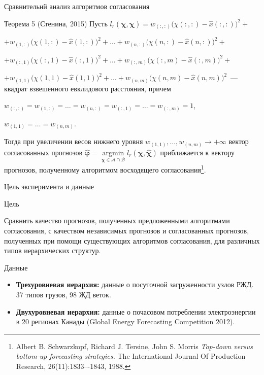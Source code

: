 \documentclass{beamer}
\newcommand\argmin{\mathop{\arg\min}}
\newcommand{\A}{\mathcal{A}}
\newcommand{\hchi}{\hat{\boldsymbol{\chi}}}
\newcommand{\hphi}{\hat{\boldsymbol{\varphi}}}
\newcommand{\B}{\mathcal{B}}
\newcommand{\hx}{\hat{x}}
\begin{document}
\begin{frame}{Сравнительнй анализ алгоритмов  согласования}
    \small
    \begin{block}{Теорема 5 (Стенина, 2015)}
        Пусть $l_r(\boldsymbol{\chi}, \hchi) = w_{(:, :)} \bigl(\chi(:, :) - \hx(:, :)\bigr)^2
        +$

        $+ w_{(1, :)} \bigl(\chi(1, :) - \hx(1, :)\bigr)^2 + \ldots + w_{(n, :)} \bigl(\chi(n, :) - \hx(n, :)\bigr)^2
        +$

        $+ w_{(:, 1)} \bigl(\chi(:, 1) - \hx(:, 1)\bigr)^2 + \ldots + w_{(:, m)} \bigl(\chi(:, m) - \hx(:, m)\bigr)^2
        +$

        $+ w_{(1, 1)} \bigl(\chi(1, 1) - \hx(1, 1)\bigr)^2 + \ldots + w_{(n, m)} \bigl(\chi(n, m) - \hx(n,
        m)\bigr)^2$~--- квадрат взвешенного евклидового расстояния, причем

        $w_{(:, :)} = w_{(1, :)} = \ldots = w_{(n, :)} = w_{(:, 1)} = \ldots = w_{(:, m)} = 1$,

        $w_{(1, 1)} = \ldots = w_{(n, m)}$.

        \vspace{0.3cm}
        Тогда при увеличении весов нижнего уровня $w_{(1, 1)}, \ldots, w_{(n, m)} \to
        +\infty$ вектор согласованных прогнозов ${\hphi = \argmin\limits_{\boldsymbol{\chi} \in \A \cap
        \B} l_r(\boldsymbol{\chi}, \hchi)}$
        приближается к вектору прогнозов, полученному алгоритмом
        восходящего согласования\footnote{\tiny Albert B. Schwarzkopf, Richard J. Tersine, John S.
        Morris \textit{Top-down versus
        bottom-up forecasting strategies.} The International Journal Of
        Production Research, 26(11):1833–-1843, 1988.}.
    \end{block}
\end{frame}
\begin{frame}{Цель эксперимента и данные}
\small
    \begin{block}{Цель}

        Сравнить качество прогнозов, полученных предложенными алгоритмами
        согласования, с качеством независимых
        прогнозов и согласованных прогнозов, полученных при помощи
        существующих алгоритмов согласования, для различных типов иерархических структур.

    \end{block}
    
    \begin{block}{Данные}
        \begin{itemize}
            \item \textcolor[rgb]{0.00,0.00,1.00}{\textbf{Трехуровневая иерархия:}} данные о посуточной
            загруженности узлов РЖД. 37 типов грузов, 98 ЖД веток.
            \item \textcolor[rgb]{0.00,0.00,1.00}{\textbf{Двухуровневая иерархия:}} данные о почасовом
            потреблении электроэнергии в 20 регионах Канады (Global Energy Forecasting Competition
            2012).
        \end{itemize}
    \end{block}

\end{frame}
\end{document}
